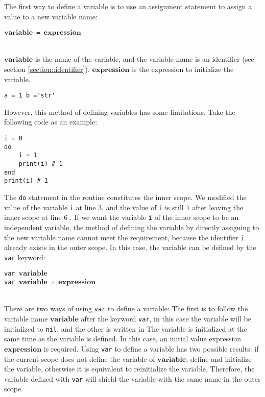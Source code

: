 The first way to define a variable is to use an assignment statement to assign a value to a new variable name:
\begin{algorithm}
$\bm{variable}$\texttt{ = }$\bm{expression}$
\end{algorithm}\vspace{-0.6em}\\
$\bm{variable}$ is the name of the variable, and the variable name is an identifier (see section \ref{section::identifier}). $\bm{expression}$ is the expression to initialize the variable.
\begin{lstlisting}[language=berry, numbers=none]
a = 1 b ='str'
\end{lstlisting}
However, this method of defining variables has some limitations. Take the following code as an example:
\begin{lstlisting}[language=berry]
i = 0
do
    i = 1
    print(i) # 1
end
print(i) # 1
\end{lstlisting}
The \texttt{do} statement in the routine constitutes the inner scope. We modified the value of the variable \texttt{i} at line 3, and the value of \texttt{i} is still \texttt{1} after leaving the inner scope at line 6 . If we want the variable \texttt{i} of the inner scope to be an independent variable, the method of defining the variable by directly assigning to the new variable name cannot meet the requirement, because the identifier \texttt{i} already exists in the outer scope. In this case, the variable can be defined by the \texttt{var} keyword:
\begin{algorithm}
\texttt{var }$\bm{variable}$ \\
\texttt{var }$\bm{variable}$\texttt{ = }$\bm{expression}$
\end{algorithm}\vspace{-0.6em}\\
There are two ways of using \texttt{var} to define a variable: The first is to follow the variable name $\bm{variable}$ after the keyword \texttt{var}, in this case the variable will be initialized to \texttt{nil}, and the other is written in The variable is initialized at the same time as the variable is defined. In this case, an initial value expression $\bm{expression}$ is required. Using \texttt{var} to define a variable has two possible results: if the current scope does not define the variable of $\bm{variable}$, define and initialize the variable, otherwise it is equivalent to reinitialize the variable. Therefore, the variable defined with \texttt{var} will shield the variable with the same name in the outer scope.

